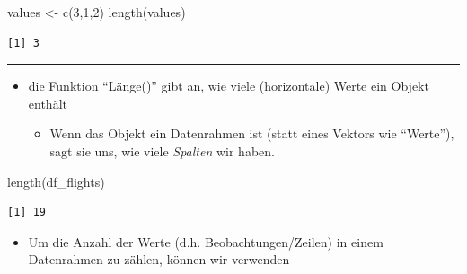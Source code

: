 \documentclass[
  letterpaper,
  DIV=11]{scrartcl}
\newenvironment{Shaded}{\begin{snugshade}}{\end{snugshade}}
\newcommand{\DecValTok}[1]{\textcolor[rgb]{0.68,0.00,0.00}{#1}}
\newcommand{\FunctionTok}[1]{\textcolor[rgb]{0.28,0.35,0.67}{#1}}
\newcommand{\NormalTok}[1]{\textcolor[rgb]{0.00,0.23,0.31}{#1}}
\newcommand{\OtherTok}[1]{\textcolor[rgb]{0.00,0.23,0.31}{#1}}
\providecommand{\tightlist}{%
  \setlength{\itemsep}{0pt}\setlength{\parskip}{0pt}}\usepackage{longtable,booktabs,array}
\begin{document}
\begin{Shaded}
\begin{Highlighting}[]
\NormalTok{values }\OtherTok{\textless{}{-}} \FunctionTok{c}\NormalTok{(}\DecValTok{3}\NormalTok{,}\DecValTok{1}\NormalTok{,}\DecValTok{2}\NormalTok{)}
\FunctionTok{length}\NormalTok{(values)}
\end{Highlighting}
\end{Shaded}

\begin{verbatim}
[1] 3
\end{verbatim}

\begin{center}\rule{0.5\linewidth}{0.5pt}\end{center}

\begin{tcolorbox}[enhanced jigsaw, breakable, colbacktitle=quarto-callout-note-color!10!white, toptitle=1mm, bottomrule=.15mm, rightrule=.15mm, coltitle=black, toprule=.15mm, opacityback=0, leftrule=.75mm, left=2mm, colframe=quarto-callout-note-color-frame, bottomtitle=1mm, titlerule=0mm, title=\textcolor{quarto-callout-note-color}{\faInfo}\hspace{0.5em}{\texttt{length()} versus \texttt{nrow()} and \texttt{n()}}, arc=.35mm, colback=white, opacitybacktitle=0.6]

\begin{itemize}
\tightlist
\item
  die Funktion ``Länge()'' gibt an, wie viele (horizontale) Werte ein
  Objekt enthält

  \begin{itemize}
  \tightlist
  \item
    Wenn das Objekt ein Datenrahmen ist (statt eines Vektors wie
    ``Werte''), sagt sie uns, wie viele \emph{Spalten} wir haben.
  \end{itemize}
\end{itemize}

\begin{Shaded}
\begin{Highlighting}[]
\FunctionTok{length}\NormalTok{(df\_flights)}
\end{Highlighting}
\end{Shaded}

\begin{verbatim}
[1] 19
\end{verbatim}

\begin{itemize}
\tightlist
\item
  Um die Anzahl der Werte (d.h. Beobachtungen/Zeilen) in einem
  Datenrahmen zu zählen, können wir verwenden


\end{itemize}
\end{tcolorbox}
\end{document}
